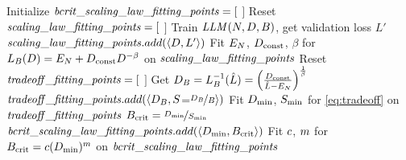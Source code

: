 \renewcommand{\algorithmiccomment}[1]{$\triangleright$ #1}
\begin{algorithm}[tb]
  \caption{Generating the $\cbs$ power law}
  \label{alg:cbs_fitting}
  \begin{algorithmic}
    \small
    \STATE Initialize $\mathit{bcrit\_scaling\_law\_fitting\_points} = [$ $]$
      \STATE {}
        \STATE Reset $\mathit{scaling\_law\_fitting\_points} = [$ $]$
          \STATE Train $\mathit{LLM}(N,D,B)$, get validation loss $L'$
          \STATE $\mathit{scaling\_law\_fitting\_points}.add( \langle D,L' \rangle )$
        \ENDFOR %
      \STATE Fit $E_N$, $D_{\text{const}}$, $\beta$ for $L_{B}(D) = E_N + D_{\text{const}} D^{-\beta}$ on $\mathit{scaling\_law\_fitting\_points}$
      \ENDFOR %
      \STATE {}
        \STATE Reset $\mathit{tradeoff\_fitting\_points} = [$ $]$
          \STATE Get $D_B = L_{B}^{-1}(\hat{L}) = \left(\frac{D_{\text{const}}}{\hat{L}-E_N}\right)^{\frac{1}{\beta}}$
          \STATE $\mathit{tradeoff\_fitting\_points}.add( \langle D_B, S$=$\nicefrac{D_B}{B} \rangle )$
        \ENDFOR %
        \STATE Fit $D_{\text{min}}$, $S_{\text{min}}$ for \cref{eq:tradeoff} on $\mathit{tradeoff\_fitting\_points}$
        \STATE $B_{\text{crit}} = \nicefrac{D_{\text{min}}}{S_{\text{min}}}$
        \STATE $\mathit{bcrit\_scaling\_law\_fitting\_points}.add( \langle D_{\text{min}}, B_{\text{crit}} \rangle )$
      \ENDFOR %
    \ENDFOR %
    \STATE Fit $c$, $m$ for $B_{\text{crit}} = {c} (D_{\text{min}})^{m}$ on $\mathit{bcrit\_scaling\_law\_fitting\_points}$
  \end{algorithmic}
\end{algorithm}

